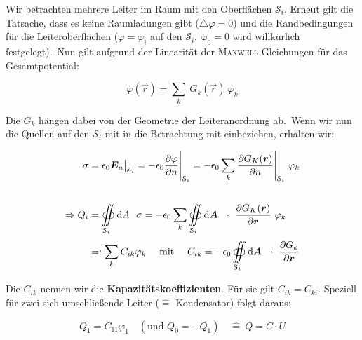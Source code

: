 Wir betrachten mehrere Leiter im Raum mit den Oberflächen $\mathcal{S}_i$. Erneut gilt die Tatsache, dass es keine Raumladungen gibt ($\bigtriangleup\varphi = 0$) und die Randbedingungen für die Leiteroberflächen ($\varphi = \varphi_i$ auf den $\mathcal{S}_i, \ \varphi_0 = 0$ wird willkürlich festgelegt).\
Nun gilt aufgrund der Linearität der \textsc{Maxwell}-Gleichungen für das Gesamtpotential:

\begin{equation*}
\varphi (\vec{r}) = \sum_k \ G_k(\vec{r}) \ \varphi_k
\end{equation*}

Die $G_k$ hängen dabei von der Geometrie der Leiteranordnung ab.\
Wenn wir nun die Quellen auf den $\mathcal{S}_i$ mit in die Betrachtung mit einbeziehen, erhalten wir: 

\begin{align*}
\sigma &= \epsilon_0 \vec{E}_n\big|_{\mathcal{S}_i}  = -\epsilon_0 \pdiff{\varphi}{n}\Bigg|_{\mathcal{S}_i} = - \epsilon_0 \sum_k \pdiff{G_K(\vec{r})}{n}\Bigg|_{\mathcal{S}_i} \ \varphi_k \\
\ \\
\Rightarrow Q_i &= \Oiint{\mathcal{S}_i}{}{A} \ \sigma = -\epsilon_0\sum_k\Oiint{\mathcal{S}_i}{}{\vec{A}}\  \cdot \ \pdiff{G_K(\vec{r})}{\vec{r}} \ \varphi_k\\
&=: \sum_k C_{ik} \varphi_k \quad \text{ mit } \quad C_{ik} = -\epsilon_0 \Oiint{\mathcal{S}_i}{}{\vec{A}} \ \cdot \ \pdiff{G_k}{\vec{r}}
\end{align*}


Die $C_{ik}$ nennen wir die \textbf{Kapazitätskoeffizienten}. Für sie gilt $C_{ik} = C_{ki}$. Speziell für zwei sich umschließende Leiter ($\hat{=}$ Kondensator) folgt daraus:

\begin{equation*}
Q_1 = C_{11}\varphi_1 \quad (\text{und } Q_0 = -Q_1) \quad \hat{=} \ Q=C \cdot U
\end{equation*}